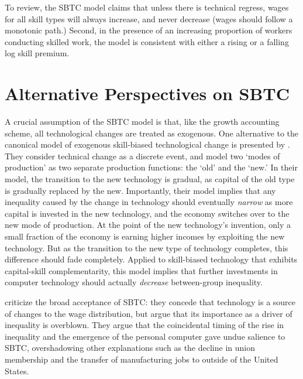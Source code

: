 
To review, the SBTC model claims that unless there is technical regress, wages for all skill types will always increase, and never decrease (wages should follow a monotonic path.) Second, in the presence of an increasing proportion of workers conducting skilled work, the model is consistent with either a rising or a falling log skill premium.

\section{Alternative Perspectives on SBTC}

A crucial assumption of the SBTC model is that, like the \citet{Solow1957} growth accounting scheme, all technological changes are treated as exogenous. One alternative to the canonical model of exogenous skill-biased technological change is presented by \citet{Beaudry2005}. They consider technical change as a discrete event, and model two `modes of production' as two separate production functions: the `old' and the `new.' In their model, the transition to the new technology is gradual, as capital of the old type is gradually replaced by the new. Importantly, their model implies that any inequality caused by the change in technology should eventually {\em narrow} as more capital is invested in the new technology, and the economy switches over to the new mode of production. At the point of the new technology's invention, only a small fraction of the economy is earning higher incomes by exploiting the new technology. But as the transition to the new type of technology completes, this difference should fade completely. Applied to skill-biased technology that exhibits capital-skill complementarity, this model implies that further investments in computer technology should actually {\em decrease} between-group inequality.

\cite{Card2002} criticize the broad acceptance of SBTC: they concede that technology is a source of changes to the wage distribution, but argue that its importance as a driver of inequality is overblown. They argue that the coincidental timing of the rise in inequality and the emergence of the personal computer gave undue salience to SBTC, overshadowing other explanations such as the decline in union membership and the transfer of manufacturing jobs to outside of the United States.

